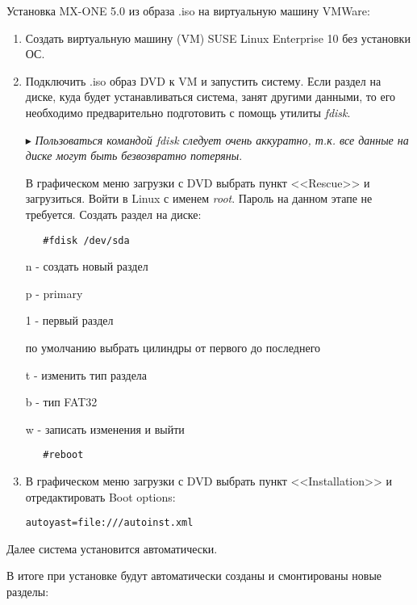 Установка MX-ONE 5.0 из образа .iso на виртуальную машину VMWare:
\begin{enumerate}
\item Создать виртуальную машину (VM) SUSE Linux Enterprise 10 без установки ОС. 
\item Подключить .iso образ DVD к VM и запустить систему.
Если раздел на диске, куда будет устанавливаться система, занят другими данными, то его необходимо предварительно подготовить с помощь утилиты {\em fdisk}.

$\blacktriangleright$ {\em Пользоваться командой fdisk следует очень аккуратно, т.к. все данные на диске могут быть безвозвратно потеряны}.

В графическом меню загрузки с DVD выбрать пункт <<Rescue>> и загрузиться. Войти в Linux с именем {\em root}. Пароль на данном этапе не требуется.
Создать раздел на диске:
  \begin{lstlisting}
   #fdisk /dev/sda
  \end{lstlisting}
\par n - создать новый раздел
\par p - primary
\par 1 - первый раздел
\par по умолчанию выбрать цилиндры от первого до последнего
\par t - изменить тип раздела
\par b - тип FAT32
\par w - записать изменения и выйти
  \begin{lstlisting}
   #reboot 
  \end{lstlisting}
    
\item  В графическом меню загрузки с DVD выбрать пункт <<Installation>> и отредактировать Boot options:
\begin{lstlisting}
autoyast=file:///autoinst.xml
\end{lstlisting}

\end{enumerate}

Далее система установится автоматически.

В итоге при установке будут автоматически созданы и смонтированы новые разделы:

